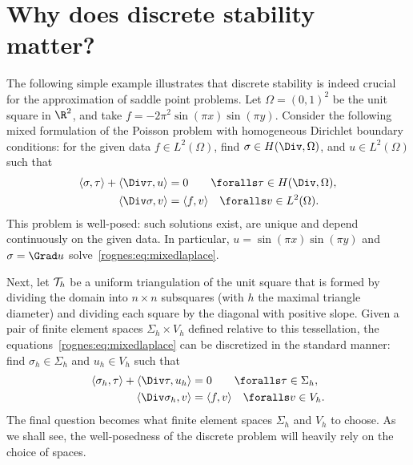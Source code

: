 \section{Why does discrete stability matter?}
\label{rognes:sec:motivation}

The following simple example illustrates that discrete stability is
indeed crucial for the approximation of saddle point problems. Let
$\Omega = (0, 1)^2$ be the unit square in $\R^2$, and take $f = - 2
\pi^2 \sin(\pi x) \sin(\pi y)$. Consider the following mixed
formulation of the Poisson problem with homogeneous Dirichlet boundary
conditions: for the given data $f \in L^2(\Omega)$, find $\sigma \in
H(\Div, \Omega)$, and $u \in L^2(\Omega)$ such that
\begin{equation}
  \label{rognes:eq:mixedlaplace}
  \begin{split}
    \langle \sigma, \tau \rangle + \langle \Div \tau, u \rangle &= 0
    \quad\quad \foralls \tau \in H(\Div, \Omega), \\
    \langle \Div \sigma, v \rangle &= \langle f, v \rangle
    \quad \foralls v \in L^2(\Omega).
  \end{split}
\end{equation}
This problem is well-posed: such solutions exist, are unique and
depend continuously on the given data. In particular, $u = \sin(\pi x)
\sin(\pi y)$ and $\sigma = \Grad u$
solve~\eqref{rognes:eq:mixedlaplace}.

Next, let $\mathcal{T}_h$ be a uniform triangulation of the unit
square that is formed by dividing the domain into $n \times n$
subsquares (with $h$ the maximal triangle diameter) and dividing each
square by the diagonal with positive slope. Given a pair of finite
element spaces $\Sigma_h \times V_h$ defined relative to this
tessellation, the equations~\eqref{rognes:eq:mixedlaplace} can be
discretized in the standard manner: find $\sigma_h \in \Sigma_h$ and
$u_h \in V_h$ such that
\begin{equation}
  \label{rognes:eq:mixedlaplace:discrete}
  \begin{split}
    \langle \sigma_h, \tau \rangle + \langle \Div \tau, u_h \rangle &= 0
    \quad\quad \foralls \tau \in \Sigma_h, \\
    \langle \Div \sigma_h, v \rangle &= \langle f, v \rangle
    \quad \foralls v \in V_h.
  \end{split}
\end{equation}
The final question becomes what finite element spaces $\Sigma_h$ and
$V_h$ to choose. As we shall see, the well-posedness of the discrete
problem will heavily rely on the choice of spaces.

